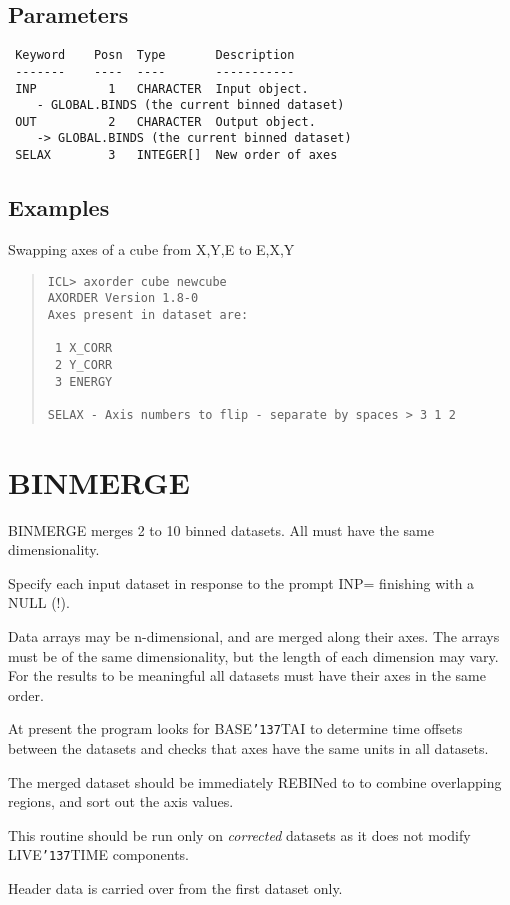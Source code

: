 \documentclass{book}
\renewcommand{\_}{{\tt\char'137}}     %
\begin{document}
\subsection{Parameters}
\begin{verbatim}
 Keyword    Posn  Type       Description
 -------    ----  ----       -----------
 INP          1   CHARACTER  Input object.
    - GLOBAL.BINDS (the current binned dataset)
 OUT          2   CHARACTER  Output object.
    -> GLOBAL.BINDS (the current binned dataset)
 SELAX        3   INTEGER[]  New order of axes

\end{verbatim}\subsection{Examples}
Swapping axes of a cube from X,Y,E to E,X,Y
\begin{quote}\begin{verbatim}
ICL> axorder cube newcube
AXORDER Version 1.8-0
Axes present in dataset are:

 1 X_CORR
 2 Y_CORR
 3 ENERGY

SELAX - Axis numbers to flip - separate by spaces > 3 1 2
\end{verbatim}\end{quote}
\section{BINMERGE}
BINMERGE merges 2 to 10 binned datasets. All must have the same
dimensionality.

Specify each input dataset in response to the prompt INP=
finishing with a NULL (!).

Data arrays may be n-dimensional, and are merged along their
axes. The arrays must be of the same dimensionality, but the
length of each dimension may vary. For the results to be
meaningful all datasets must have their axes in the same order.

At present the program looks for BASE\_TAI to determine time
offsets between the datasets and checks that axes have the same
units in all datasets.

The merged dataset should be immediately REBINed to to combine
overlapping regions, and sort out the axis values.

This routine should be run only on {\em corrected} datasets as it does
not modify LIVE\_TIME components.

Header data is carried over from the first dataset only.
\end{document}
